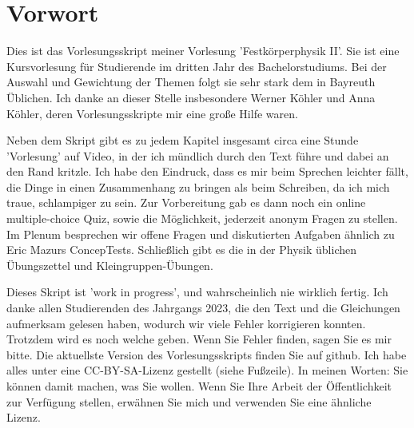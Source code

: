 \renewcommand{\lastmod}{\ \ }
\renewcommand{\chapterauthors}{\ \ }

\chapter*{Vorwort}

Dies ist das Vorlesungsskript meiner Vorlesung 'Festkörperphysik II'. Sie ist eine Kursvorlesung für  Studierende im dritten Jahr des Bachelorstudiums. Bei der Auswahl und Gewichtung der Themen folgt sie sehr stark dem in Bayreuth Üblichen. Ich danke an dieser Stelle insbesondere Werner Köhler und Anna Köhler, deren Vorlesungsskripte mir eine große Hilfe waren.

Neben dem Skript gibt es zu jedem Kapitel  insgesamt circa eine Stunde 'Vorlesung' auf Video, in der ich mündlich durch den Text führe und dabei an den Rand kritzle.
Ich habe den Eindruck, dass es mir beim Sprechen leichter fällt, die Dinge in einen Zusammenhang zu bringen als beim Schreiben, da ich mich traue, schlampiger zu sein. Zur Vorbereitung gab es dann noch ein online multiple-choice Quiz, sowie die Möglichkeit, jederzeit anonym Fragen zu stellen.  Im Plenum  besprechen wir offene Fragen und diskutierten Aufgaben ähnlich zu Eric Mazurs 
ConcepTests.  Schließlich gibt es die in der Physik üblichen Übungszettel und Kleingruppen-Übungen. 



Dieses Skript ist 'work in progress', und wahrscheinlich nie wirklich fertig.  Ich danke allen Studierenden des Jahrgangs 2023, die den Text und die Gleichungen aufmerksam gelesen haben, wodurch wir viele Fehler korrigieren konnten. Trotzdem wird es noch welche geben. Wenn Sie Fehler finden, sagen Sie es mir bitte. 
Die aktuellste Version des Vorlesungsskripts finden Sie auf github.  Ich habe alles unter eine CC-BY-SA-Lizenz gestellt (siehe Fußzeile). In meinen Worten: Sie können damit machen, was Sie wollen. Wenn Sie Ihre Arbeit der Öffentlichkeit zur Verfügung stellen, erwähnen Sie mich und verwenden Sie eine ähnliche Lizenz. 


